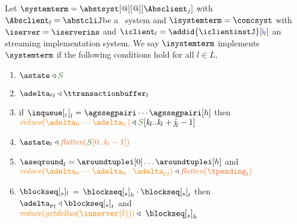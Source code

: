 \begin{definition} \label{def:implementation}
Let  $\systemterm = \abstsyst[@][@][\Absclient_j]$ with $\Absclient_l={\abstcliJ}$be a \tgspcalculus\ system and 
$\isystemterm = \concsyst $  with $\iserver = \iserverins$ and $\iclient_l = \addid{\iclientinstJ}[{\cid{_l}}]$ 
an streaming implementation
system. We say $\isystemterm$ implements $\systemterm$ if the following conditions hold for all $l \in L$,

\begin{enumerate}
	\item \label{prop_stateserver} $\astate \triangleleft \queuemessage$
	\item \label{prop_transactions} ${\transactionbuffer}_l\triangleleft{\ttransactionbuffer}_l$ 
	\item \label{prop_inclient} if ${\inclient}_l = \agssegpairi \cdots \agssegpairi[h]$ then $\ireduce{\adelta_0\cdots\adelta_h}\triangleleft  \queuemessage[\tknown_l..\tknown_l+\treceivebuffer_l-1]$
	
	\item \label{prop_state_known} $\astate_l \triangleleft \flatten {\queuemessage[0 .. \tknown_l - 1]}$
	\item \label{prop_pending} $\pending_l = \aroundtuplei[0]\ldots\aroundtuplei[h]$ and $\ireduce{\adelta_0\cdots\adelta_h\cdot {\pushbuffer}_l} \triangleleft \flatten{\tpending_l}$
	\item \label{prop_send} $\tsent_l$ = ${\tsent}_h \cdot {\tsent}_t $ then $ {\pushbuffer}_l \triangleleft {\tsent}_t$ and $\ireduce{\igetdeltas{\inserver(l)}} \triangleleft \ {\tsent}_h$


\end{enumerate}
\end{definition}
